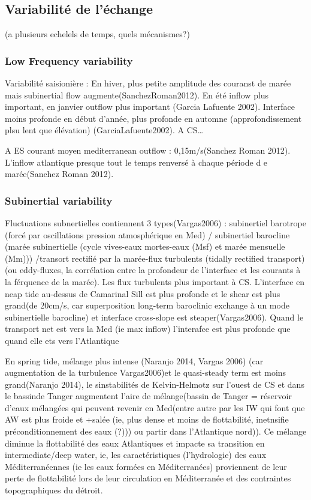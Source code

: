 \subsection{Variabilité de l'échange}

(a plusieurs echelels de temps, quels mécanismes?)

\subsubsection{Low Frequency variability}
Variabilité saisionière : En hiver, plus petite amplitude des couranst de marée mais subinertial flow augmente(SanchezRoman2012). En été inflow plus important, en janvier outflow plus important (Garcia Lafuente 2002). Interface moins profonde en début d’année, plus profonde en automne (approfondissement plsu lent que élévation) (GarciaLafuente2002).
A CS…

A ES courant moyen mediterranean outflow : 0,15m/s(Sanchez Roman 2012). L’inflow atlantique presque tout le temps renversé à chaque période d e marée(Sanchez Roman 2012).


\subsubsection{Subinertial variability}
Fluctuations subnertielles contiennent 3 types(Vargas2006) : subinertiel barotrope (forcé par oscillations pression atmosphérique en Med) / subinertiel barocline (marée subinertielle (cycle vives-eaux mortes-eaux (Msf) et marée mensuelle (Mm))) /transort rectifié par la marée-flux turbulents (tidally rectified transport) (ou eddy-fluxes, la corrélation entre la profondeur de l’interface et les courants à la férquence de la marée). Les flux turbulents plus important à CS.
L’interface en neap tide au-dessus de Camarinal Sill est plus profonde et le shear est plus grand(de 20cm/s, car superposition long-term baroclinic exchange à un mode subinertielle barocline) et interface cross-slope est steaper(Vargas2006). Quand le transport net est vers la Med (ie max inflow) l’interafce est plus profonde que quand elle ets vers l’Atlantique




En spring tide, mélange plus intense (Naranjo 2014, Vargas 2006) (car augmentation de la turbulence Vargas2006)et le quasi-steady term est moins grand(Naranjo 2014), le sinstabilités de Kelvin-Helmotz sur l’ouest de CS et dans le bassinde Tanger augmentent l’aire de mélange(bassin de Tanger = réservoir d’eaux mélangées qui peuvent revenir en Med(entre autre par les IW qui font que AW est plus froide et +salée (ie, plus dense et moins de flottabilité, inetnsifie préconditionnement des eaux (?))) ou partir dans l’Atlantique nord)). Ce mélange diminue la flottabilité des eaux Atlantiques et impacte sa transition en intermediate/deep water, ie, les caractéristiques (l’hydrologie) des eaux Méditerranéennes (ie les eaux formées en Méditerranées) proviennent de leur perte de flottabilité lors de leur circulation en Méditerranée et des contraintes topographiques du détroit.



